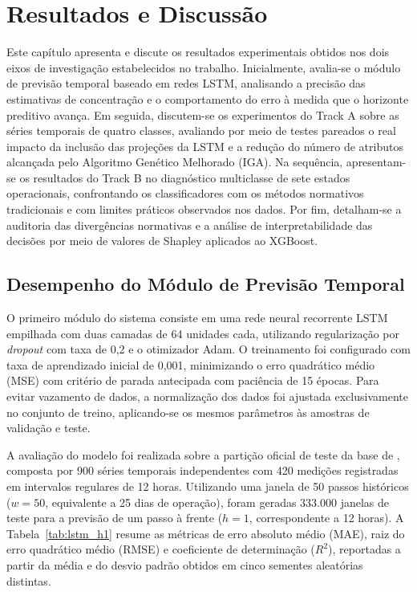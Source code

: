 \chapter{Resultados e Discussão}\label{cap:resultados}

Este capítulo apresenta e discute os resultados experimentais obtidos nos dois eixos de investigação estabelecidos no trabalho. Inicialmente, avalia-se o módulo de previsão temporal baseado em redes LSTM, analisando a precisão das estimativas de concentração e o comportamento do erro à medida que o horizonte preditivo avança. Em seguida, discutem-se os experimentos do Track A sobre as séries temporais de quatro classes, avaliando por meio de testes pareados o real impacto da inclusão das projeções da LSTM e a redução do número de atributos alcançada pelo Algoritmo Genético Melhorado (IGA). Na sequência, apresentam-se os resultados do Track B no diagnóstico multiclasse de sete estados operacionais, confrontando os classificadores com os métodos normativos tradicionais e com limites práticos observados nos dados. Por fim, detalham-se a auditoria das divergências normativas e a análise de interpretabilidade das decisões por meio de valores de Shapley aplicados ao XGBoost.

\section{Desempenho do Módulo de Previsão Temporal}\label{sec:res_lstm}

O primeiro módulo do sistema consiste em uma rede neural recorrente LSTM empilhada com duas camadas de 64 unidades cada, utilizando regularização por \textit{dropout} com taxa de 0,2 e o otimizador Adam. O treinamento foi configurado com taxa de aprendizado inicial de 0,001, minimizando o erro quadrático médio (MSE) com critério de parada antecipada com paciência de 15 épocas. Para evitar vazamento de dados, a normalização dos dados foi ajustada exclusivamente no conjunto de treino, aplicando-se os mesmos parâmetros às amostras de validação e teste.

A avaliação do modelo foi realizada sobre a partição oficial de teste da base de , composta por 900 séries temporais independentes com 420 medições registradas em intervalos regulares de 12 horas. Utilizando uma janela de 50 passos históricos ($w = 50$, equivalente a 25 dias de operação), foram geradas 333.000 janelas de teste para a previsão de um passo à frente ($h = 1$, correspondente a 12 horas). A Tabela~\ref{tab:lstm_h1} resume as métricas de erro absoluto médio (MAE), raiz do erro quadrático médio (RMSE) e coeficiente de determinação ($R^2$), reportadas a partir da média e do desvio padrão obtidos em cinco sementes aleatórias distintas.


